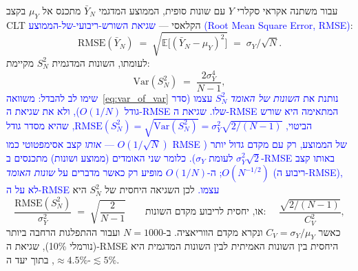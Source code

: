 \documentclass[12pt,a4paper]{article}
\newcommand{\EX}{\mathbb{E}}
\DeclareRobustCommand{\aiedit}[1]{\textcolor{blue}{#1}}
\begin{document}
עבור משתנה אקראי סקלרי $Y$ עם שונות סופית, הממוצע המדגמי
$\bar Y_N$ מתכנס אל $\mu_Y$ בקצב \textenglish{CLT} הקלאסי —
\aiedit{שגיאת השורש-ריבועי-של-הממוצע (\textenglish{Root Mean Square Error, RMSE})}:%
\begin{equation}
  \mathrm{RMSE}(\bar Y_N) \;=\; \sqrt{\EX\bigl[(\bar Y_N-\mu_Y)^2\bigr]} \;=\; \sigma_Y / \sqrt{N}.
\end{equation}
לעומתו, השונות המדגמית $S_N^2$ מקיימת:
\begin{equation}
  \mathrm{Var}(S_N^2) \;=\; \frac{2\sigma_Y^4}{N-1},
  \label{eq:var_of_var}
\end{equation}
\aiedit{שימו לב להבדל: משוואה~\ref{eq:var_of_var} נותנת את \emph{השונות של האומד} $S_N^2$ עצמו
(סדר גודל $O(1/N)$), ולא את שגיאת ה-RMSE שלו. שגיאת ה-RMSE המתאימה היא שורש הביטוי,
$\mathrm{RMSE}(S_N^2)=\sqrt{\mathrm{Var}(S_N^2)}=\sigma_Y^2\sqrt{2/(N-1)}$, שהיא מסדר גודל
$O(1/\sqrt{N})$ — \emph{אותו} קצב אסימפטוטי כמו RMSE של הממוצע, רק עם מקדם גדול יותר
($\sigma_Y^2\sqrt{2}$ לעומת $\sigma_Y$). כלומר שני האומדים (ממוצע ושונות) מתכנסים
ב-RMSE באותו קצב $O(N^{-1/2})$; ה-$O(1/N)$ מופיע רק כאשר מדברים על \emph{שונות האומד}
(ריבוע ה-RMSE), לא על ה-RMSE עצמו.}
לכן השגיאה היחסית של $S_N^2$ היא
\begin{equation}
  \frac{\mathrm{RMSE}(S_N^2)}{\sigma_Y^2} \;=\; \sqrt{\frac{2}{N-1}}
  \qquad\text{או, יחסית לריבוע מקדם השונות: } \quad \frac{\sqrt{2/(N-1)}}{C_V^2},
\end{equation}
כאשר $C_V=\sigma_Y/\mu_Y$ ונקרא מקדם הווריאציה.
ב-$N=1000$ ועבור ההתפלגות הרחבה ביותר (נורמלי 10\%{}), שגיאת ה-RMSE היחסית
בין השונות האמיתית לבין השונות המדגמית היא $\approx 4.5\%$, בתוך יעד ה-$\lesssim 5\%$.
\end{document}
